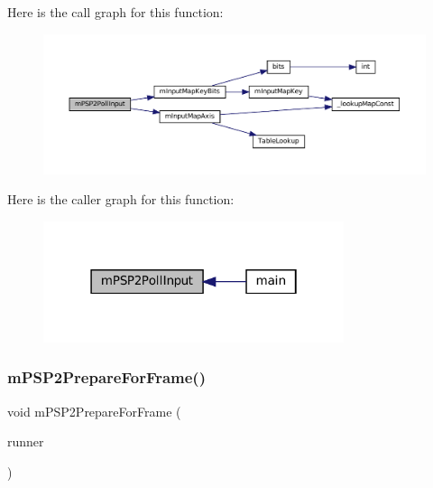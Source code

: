 Here is the call graph for this function\+:
\nopagebreak
\begin{figure}[H]
\begin{center}
\leavevmode
\includegraphics[width=350pt]{psp2-context_8h_a29b280976db23268da118020f60ce728_cgraph}
\end{center}
\end{figure}
Here is the caller graph for this function\+:
\nopagebreak
\begin{figure}[H]
\begin{center}
\leavevmode
\includegraphics[width=250pt]{psp2-context_8h_a29b280976db23268da118020f60ce728_icgraph}
\end{center}
\end{figure}
\mbox{\label{psp2-context_8h_a0297c6f8d15a9f0b20d14944e45bbac8}} 
\subsubsection{\texorpdfstring{m\+P\+S\+P2\+Prepare\+For\+Frame()}{mPSP2PrepareForFrame()}}
{\footnotesize\ttfamily void m\+P\+S\+P2\+Prepare\+For\+Frame (\begin{DoxyParamCaption}\item[{struct \mbox{\hyperlink{structm_g_u_i_runner}{m\+G\+U\+I\+Runner}} $\ast$}]{runner }\end{DoxyParamCaption})}

\mbox{\label{psp2-context_8h_a9a298ef5f14d11b2cf482a19a3a55d82}} 
